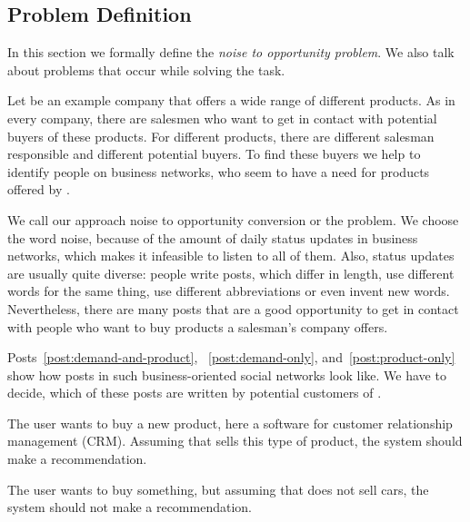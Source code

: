 \subsection{Problem Definition}
\label{sec:background-problem}

In this section we formally define the \emph{noise to opportunity problem}.
We also talk about problems that occur while solving the task.

Let \acme be an example company that offers a wide range of different products.
As in every company, there are salesmen who want to get in contact with potential buyers of these products.
For different products, there are different salesman responsible and different potential buyers.
To find these buyers we help \acme to identify people on business networks, who seem to have a need for products offered by \acme.

We call our approach noise to opportunity conversion or the \nto problem.
We choose the word noise, because of the amount of daily status updates in business networks, which makes it infeasible to listen to all of them.
Also, status updates are usually quite diverse: people write posts, which differ in length, use different words for the same thing, use  different abbreviations or even invent new words.
Nevertheless, there are many posts that are a good opportunity to get in contact with people who want to buy products a salesman's company offers.

Posts~\ref{post:demand-and-product}, ~\ref{post:demand-only}, and~\ref{post:product-only} show how posts in such business-oriented social networks look like.
We have to decide, which of these posts are written by potential customers of \acme.

\begin{post}
	\centering
	\caption{The user wants to buy a new product, here a software for customer relationship management (CRM). Assuming that \acme sells this type of product, the system should make a recommendation.}
	\label{post:demand-and-product}
\end{post}

\begin{post}
	\centering
	\caption{The user wants to buy something, but assuming that \acme does not sell cars, the system should not make a recommendation.}
	\label{post:demand-only}
\end{post}

